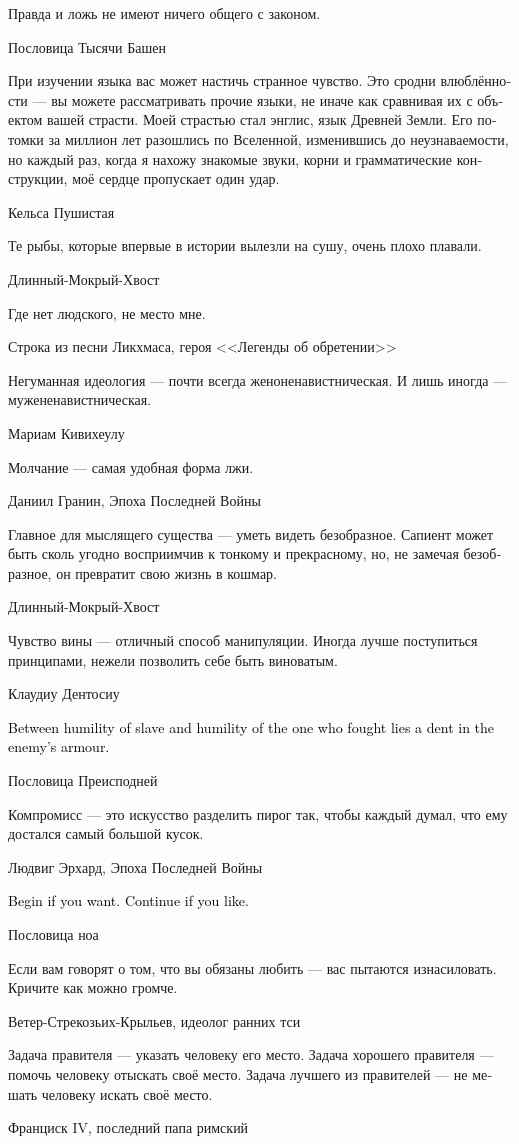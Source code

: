 \documentclass[a4paper,12pt,fleqn]{book}\usepackage{cooltooltips}\usepackage{polyglossia}\setdefaultlanguage[babelshorthands=true]{russian}\setotherlanguage{english}\defaultfontfeatures{Ligatures=TeX,Mapping=tex-text} \usepackage{xcolor}\definecolor{lightgray}{HTML}{bbbbbb}\color{lightgray}\newcommand{\ml}[3]{\textenglish{\textcolor{black}{#3}}}
\begin{document}
{\epigraph
{Правда и ложь не имеют ничего общего с законом.}
{Пословица Тысячи Башен}

\epigraph
{При изучении языка вас может настичь странное чувство.
Это сродни влюблённости --- вы можете рассматривать прочие языки, не иначе как сравнивая их с объектом вашей страсти.
Моей страстью стал энглис, язык Древней Земли.
Его потомки за миллион лет разошлись по Вселенной, изменившись до неузнаваемости, но каждый раз, когда я нахожу знакомые звуки, корни и грамматические конструкции, моё сердце пропускает один удар.}
{Кельса Пушистая}

\epigraph{Те рыбы, которые впервые в истории вылезли на сушу, очень плохо плавали.}
{Длинный-Мокрый-Хвост}

\epigraph
{Где нет людского, не место мне.}
{Строка из песни Ликхмаса, героя <<Легенды об обретении>>}

\epigraph
{Негуманная идеология --- почти всегда женоненавистническая.
И лишь иногда --- мужененавистническая.}
{Мариам Кивихеулу}

\epigraph
{Молчание --- самая удобная форма лжи.}
{Даниил Гранин, Эпоха Последней Войны}

\epigraph
{Главное для мыслящего существа --- уметь видеть безобразное.
Сапиент может быть сколь угодно восприимчив к тонкому и прекрасному, но, не замечая безобразное, он превратит свою жизнь в кошмар.}
{Длинный-Мокрый-Хвост}

\epigraph
{Чувство вины --- отличный способ манипуляции.
Иногда лучше поступиться принципами, нежели позволить себе быть виноватым.}
{Клаудиу Дентосиу}

\epigraph{
\ml{$0$}
{Разница между смирением раба и смирением того, кто боролся --- в той вмятине, которая осталась на броне противника.}
{Between humility of slave and humility of the one who fought lies a dent in the enemy's armour.}
}{Пословица Преисподней}

\epigraph
{Компромисс --- это искусство разделить пирог так, чтобы каждый думал, что ему достался самый большой кусок.}
{Людвиг Эрхард, Эпоха Последней Войны}

\epigraph{
\ml{$0$}
{Начинай, если хочешь.}
{Begin if you want.}
\ml{$0$}
{Продолжай, если нравится.}
{Continue if you like.}
}{Пословица ноа}

\epigraph
{Если вам говорят о том, что вы обязаны любить --- вас пытаются изнасиловать.
Кричите как можно громче.}
{Ветер-Стрекозьих-Крыльев, идеолог ранних тси}

\epigraph
{Задача правителя --- указать человеку его место.
Задача хорошего правителя --- помочь человеку отыскать своё место.
Задача лучшего из правителей --- не мешать человеку искать своё место.}
{Франциск IV, последний папа римский}

}
\end{document}
